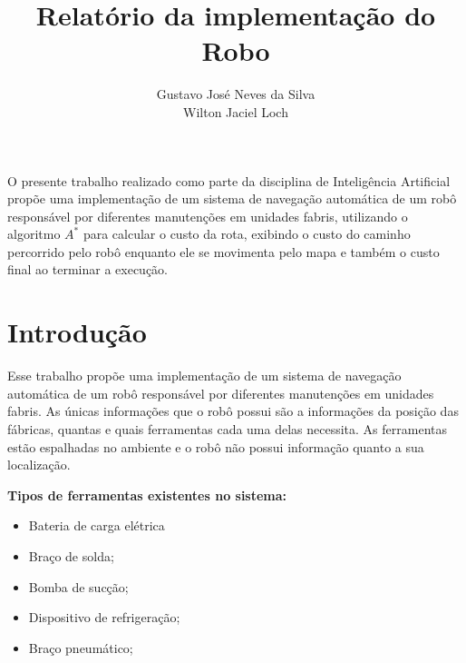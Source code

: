 \documentclass[12pt]{article}
\title{Relatório da implementação do Robo}
\author{Gustavo José Neves da Silva\inst{1}\\Wilton Jaciel Loch\inst{1}}
\begin{document}
 

\maketitle

     
\begin{resumo}
O presente trabalho realizado como parte da disciplina de Inteligência Artificial propõe uma implementação de um sistema de navegação automática de um robô responsável por diferentes manutenções em unidades fabris, utilizando o algoritmo $A^{*}$ para calcular o custo da rota, exibindo o custo do caminho percorrido pelo robô enquanto ele se movimenta pelo mapa e também o custo final ao terminar a execução.
\end{resumo}

\section{Introdução} \label{sec:Introducao}
Esse trabalho propõe uma implementação de um sistema de navegação automática de um robô responsável por diferentes manutenções em unidades fabris.
%
As únicas informações que o robô possui são a informações da posição das fábricas, quantas e quais ferramentas cada uma delas necessita.
%
As ferramentas estão espalhadas no ambiente e o robô não possui informação quanto a sua localização.

\textbf{Tipos de ferramentas existentes no sistema:}
\begin{itemize}
	\item Bateria de carga elétrica
	\item Braço de solda;
	\item Bomba de sucção;
	\item Dispositivo de refrigeração;
	\item Braço pneumático;
\end{itemize}
\end{document}
